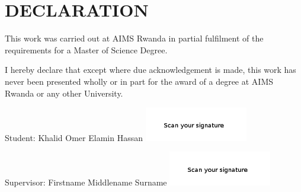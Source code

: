 \chapter*{DECLARATION}
This work was carried out at AIMS Rwanda in partial fulfilment of the requirements for a Master of Science Degree.

I hereby declare that except where due acknowledgement is made, this work has never been presented wholly or in part for the award of a degree at AIMS Rwanda or any other University.

\vspace{1.5cm}
Student: Khalid Omer Elamin Hassan \includegraphics[height=1.5cm]{images/signature.png}

\vspace{1.5cm}

Supervisor: Firstname Middlename Surname \includegraphics[height=1.5cm]{images/signature1.png}


%
%
%
%

